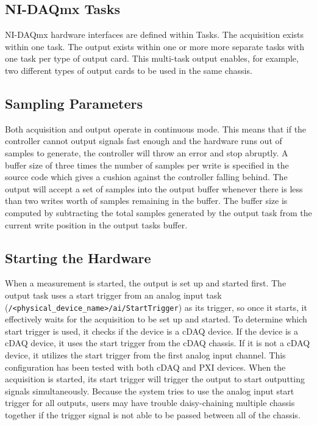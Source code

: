 \documentclass[pdf,12pt,report]{SANDreport}
\newcommand{\inlineCode}{\lstinline[basicstyle=\bfseries\ttfamily]}
\begin{document}
    \subsection{NI-DAQmx Tasks}
    NI-DAQmx hardware interfaces are defined within Tasks.  The acquisition exists within one task.  The output exists within one or more more separate tasks with one task per type of output card.  This multi-task output enables, for example, two different types of output cards to be used in the same chassis.  
    
    \subsection{Sampling Parameters}
    Both acquisition and output operate in continuous mode.  This means that if the controller cannot output signals fast enough and the hardware runs out of samples to generate, the controller will throw an error and stop abruptly.  A buffer size of three times the number of samples per write is specified in the source code which gives a cushion against the controller falling behind.  The output will accept a set of samples into the output buffer whenever there is less than two writes worth of samples remaining in the buffer.  The buffer size is computed by subtracting the total samples generated by the output task from the current write position in the output tasks buffer.
    
    \subsection{Starting the Hardware}
    When a measurement is started, the output is set up and started first.  The output task uses a start trigger from an analog input task (\inlineCode{/<physical_device_name>/ai/StartTrigger}) as its trigger, so once it starts, it effectively waits for the acquisition to be set up and started.  To determine which start trigger is used, it checks if the device is a cDAQ device.  If the device is a cDAQ device, it uses the start trigger from the cDAQ chassis.  If it is not a cDAQ device, it utilizes the start trigger from the first analog input channel.  This configuration has been tested with both cDAQ and PXI devices.  When the acquisition is started, its start trigger will trigger the output to start outputting signals simultaneously.  Because the system tries to use the analog input start trigger for all outputs, users may have trouble daisy-chaining multiple chassis together if the trigger signal is not able to be passed between all of the chassis.
    
\end{document}

